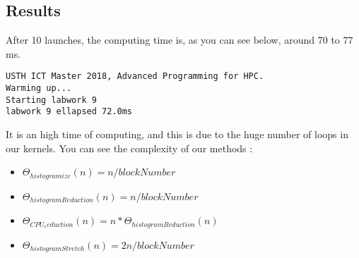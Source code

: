 \documentclass{article}
\begin{document}
\subsection{Results}
    After 10 launches, the computing time is, as you can see below, around 70 to 77 ms. 
    \begin{verbatim}
USTH ICT Master 2018, Advanced Programming for HPC.
Warming up...
Starting labwork 9
labwork 9 ellapsed 72.0ms
    \end{verbatim}
    
It is an high time of computing, and this is due to the huge number of loops in our kernels. You can see the complexity of our methods : 
    
    \begin{itemize}
        \item $\Theta_{histogramize}(n) = n / blockNumber$  
        \item $\Theta_{histogramReduction}(n) = n / blockNumber$  
        \item $\Theta_{CPU_reduction}(n) = n * \Theta_{histogramReduction}(n)$
        \item $\Theta_{histogramStretch}(n) = 2n / blockNumber$
    \end{itemize}
\end{document}
